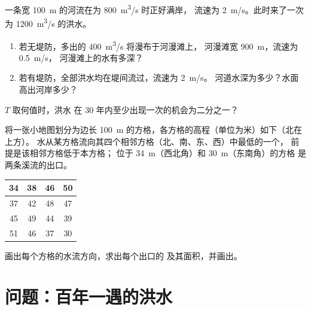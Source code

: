 \begin{exercise}[$\star\star\star$]\label{exo:g10:drainage-basins:13}
一条宽 \qty{100}{m} 的河流在为 \qty{800}{m^3/s} 时正好满岸，
流速为 \qty{2}{m/s}。此时来了一次为 \qty{1200}{m^3/s} 的洪水。
\begin{enumerate}
  \item 若无堤防，多出的 \qty{400}{m^3/s} 将漫布于河漫滩上，
        河漫滩宽 \qty{900}{m}，流速为 \qty{0.5}{m/s}，
        河漫滩上的水有多深？
  \item 若有堤防，全部洪水均在堤间流过，流速为 \qty{2}{m/s}。
        河道水深为多少？水面高出河岸多少？
\end{enumerate}
\end{exercise}

\begin{exercise}[$\star\star\star$]\label{exo:g10:drainage-basins:14}
 $T$ 取何值时，洪水
在 \num{30} 年内至少出现一次的机会为二分之一？
\end{exercise}

\begin{exercise}[$\star\star\star$]\label{exo:g10:drainage-basins:15}
将一张小地图划分为边长 \qty{100}{m} 的方格，各方格的高程（单位为米）如下（北在上方）。
水从某方格流向其四个相邻方格（北、南、东、西）中最低的一个，
前提是该相邻方格低于本方格；
位于 \qty{34}{m}（西北角）和 \qty{30}{m}（东南角）的方格
是两条溪流的出口。
\begin{center}
\begin{tabular}{|c|c|c|c|}
\hline
34 & 38 & 46 & 50 \\ \hline
37 & 42 & 48 & 47 \\ \hline
45 & 49 & 44 & 39 \\ \hline
51 & 46 & 37 & 30 \\ \hline
\end{tabular}
\end{center}
画出每个方格的水流方向，求出每个出口的
及其面积，并画出。
\end{exercise}

\section{问题：百年一遇的洪水}

